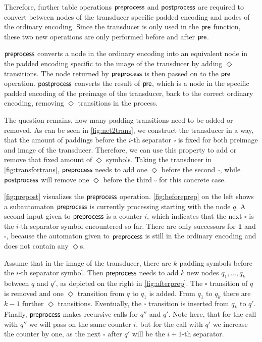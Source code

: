 Therefore, further table operations $\operatorname{\textsf{preprocess}}$ and $\operatorname{\textsf{postprocess}}$ are required to convert between nodes of the transducer specific padded encoding and nodes of the ordinary encoding. Since the transducer is only used in the $\operatorname{\textsf{pre}}$ function, these two new operations are only performed before and after $\operatorname{\textsf{pre}}$. 

$\operatorname{\textsf{preprocess}}$ converts a node in the ordinary encoding into an equivalent node in the padded encoding specific to the image of the transducer by adding $\Diamond$ transitions. The node returned by $\operatorname{\textsf{preprocess}}$ is then passed on to the $\operatorname{\textsf{pre}}$ operation. $\operatorname{\textsf{postprocess}}$ converts the result of $\operatorname{\textsf{pre}}$, which is a node in the specific padded encoding of the preimage of the transducer, back to the correct ordinary encoding, removing $\Diamond$ transitions in the process.

The question remains, how many padding transitions need to be added or removed.
As can be seen in \autoref{fig:net2trans}, we construct the transducer in a way, that the amount of paddings before the $i$-th separator $\square$ is fixed for both preimage and image of the transducer. Therefore, we can use this property to add or remove that fixed amount of $\Diamond$ symbols. Taking the transducer in \autoref{fig:transfortrans}, $\operatorname{\textsf{preprocess}}$ needs to add one $\Diamond$ before the second $\square$, while $\operatorname{\textsf{postprocess}}$ will remove one $\Diamond$ before the third $\square$ for this concrete case.



\autoref{fig:prepost} visualizes the $\operatorname{\textsf{preprocess}}$ operation. \autoref{fig:beforeprep} on the left shows a subautomaton $\operatorname{\textsf{preprocess}}$ is currently processing starting with the node $q$. A second input given to $\operatorname{\textsf{preprocess}}$ is a counter $i$, which indicates that the next $\square$ is the $i$-th separator symbol encountered so far. There are only successors for $\bm{1}$ and $\square$, because the automaton given to $\operatorname{\textsf{preprocess}}$ is still in the ordinary encoding and does not contain any $\Diamond$s. 

Assume that in the image of the transducer, there are $k$ padding symbols before the $i$-th separator symbol. Then $\operatorname{\textsf{preprocess}}$ needs to add $k$ new nodes $q_{1},\dots,q_{k}$ between $q$ and $q'$, as depicted on the right in \autoref{fig:afterprep}. The $\square$ transition of $q$ is removed and one $\Diamond$ transition from $q$ to $q_{1}$ is added. From $q_{1}$ to $q_{k}$ there are $k-1$ further $\Diamond$ transitions. Eventually, the $\square$ transition is inserted from $q_{k}$ to $q'$. Finally, $\operatorname{\textsf{preprocess}}$ makes recursive calls for $q''$ and $q'$. Note here, that for the call with $q''$ we will pass on the same counter $i$, but for the call with $q'$ we increase the counter by one, as the next $\square$ after $q'$ will be the $i+1$-th separator.

